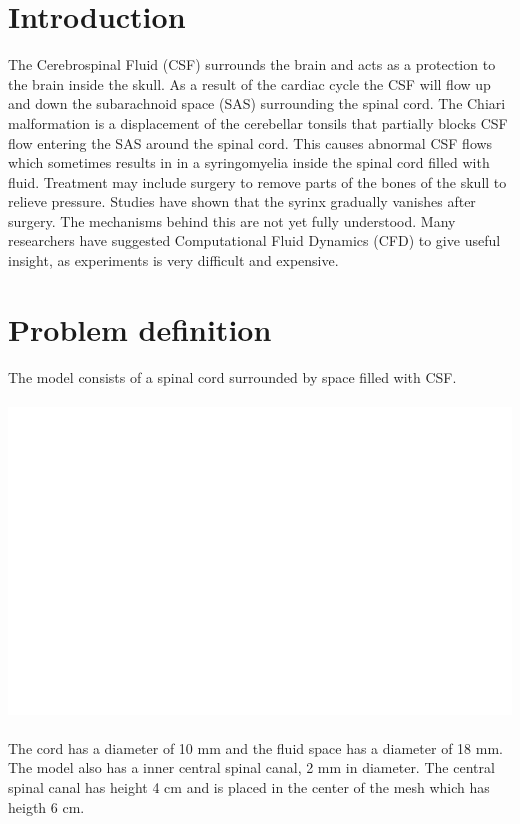 \documentclass{article}%
\begin{document}
\section{Introduction}
The Cerebrospinal Fluid (CSF) surrounds the brain and acts as a protection to the brain inside the skull. As a result of the cardiac cycle the CSF will flow up and down the subarachnoid space (SAS) surrounding the spinal cord. The Chiari malformation is a displacement of the cerebellar tonsils that partially blocks CSF flow entering the SAS around the spinal cord. This causes abnormal CSF flows which sometimes results in in a syringomyelia inside the spinal cord filled with fluid. Treatment may include surgery to remove parts of the bones of the skull to relieve pressure. Studies have shown that the syrinx gradually vanishes after surgery. The mechanisms behind this are not yet fully understood. Many researchers have suggested Computational Fluid Dynamics (CFD) to give useful insight, as experiments is very difficult and expensive. 
\\

\section{Problem definition}
The model consists of a spinal cord surrounded by space filled with CSF. \\ \\ 
\hspace*{2cm}\includegraphics[scale=0.2]{mesh}
\\ \\
The cord has a diameter of 10 mm and the fluid space has a diameter of 18 mm. The model also has a inner central spinal canal, 2 mm in diameter. The central spinal canal has height 4 cm and is placed in the center of the mesh which has heigth 6 cm. \\
\end{document}
